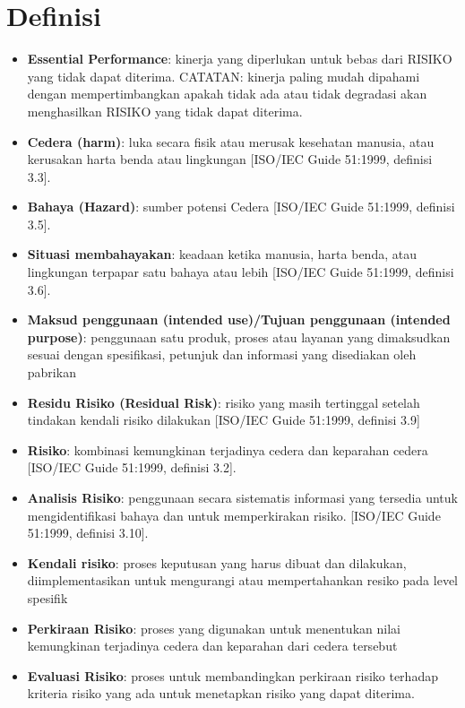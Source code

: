 \documentclass[11pt,a4paper,twoside,onecolumn]{book}
\begin{document}
		\section{Definisi}
		\begin{itemize}
			\item \textbf{Essential Performance}: kinerja yang diperlukan untuk bebas dari RISIKO yang tidak dapat diterima.
			\linebreak
			CATATAN: kinerja paling mudah dipahami dengan mempertimbangkan apakah
			tidak ada atau tidak degradasi akan menghasilkan RISIKO yang tidak dapat
			diterima.
			\item \textbf{Cedera (harm)}: luka secara fisik atau merusak kesehatan manusia, atau kerusakan harta benda atau lingkungan [ISO/IEC Guide 51:1999, definisi 3.3].
			\item \textbf{Bahaya (Hazard)}: sumber potensi Cedera [ISO/IEC Guide 51:1999, definisi 3.5].
			\item \textbf{Situasi membahayakan}: keadaan ketika manusia, harta benda, atau lingkungan terpapar satu bahaya atau lebih [ISO/IEC Guide 51:1999, definisi 3.6].
			\item \textbf{Maksud penggunaan (intended use)/Tujuan penggunaan (intended purpose)}: penggunaan satu produk, proses atau layanan yang dimaksudkan sesuai dengan spesifikasi, petunjuk dan informasi yang disediakan oleh pabrikan
			\item \textbf{Residu Risiko (Residual Risk)}: risiko yang masih tertinggal setelah tindakan kendali risiko dilakukan [ISO/IEC Guide 51:1999, definisi 3.9]
			\item \textbf{Risiko}: kombinasi kemungkinan terjadinya cedera dan keparahan cedera [ISO/IEC Guide 51:1999, definisi 3.2].
			\item \textbf{Analisis Risiko}: penggunaan secara sistematis informasi yang tersedia untuk mengidentifikasi bahaya dan untuk memperkirakan risiko. [ISO/IEC Guide 51:1999, definisi 3.10].
			\item \textbf{Kendali risiko}: proses keputusan yang harus dibuat dan dilakukan, diimplementasikan untuk mengurangi atau mempertahankan resiko pada level spesifik
			\item \textbf{Perkiraan Risiko}: proses yang digunakan untuk menentukan nilai kemungkinan terjadinya cedera dan keparahan dari cedera tersebut
			\item \textbf{Evaluasi Risiko}: proses untuk membandingkan perkiraan risiko terhadap kriteria risiko yang ada untuk menetapkan risiko yang dapat diterima.
		\end{itemize}
	\newpage
	
\end{document}
